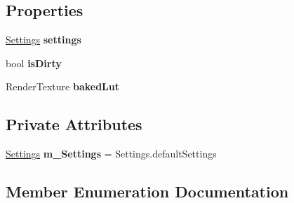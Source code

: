 \subsection*{Properties}
\begin{DoxyCompactItemize}
\item 
\mbox{\label{class_unity_engine_1_1_post_processing_1_1_color_grading_model_a340b78e970e8cc5c66abbd4957d88b9c}} 
\hyperlink{struct_unity_engine_1_1_post_processing_1_1_color_grading_model_1_1_settings}{Settings} {\bfseries settings}
\item 
\mbox{\label{class_unity_engine_1_1_post_processing_1_1_color_grading_model_a05a2c8285ca219e5846080bec932b988}} 
bool {\bfseries is\+Dirty}
\item 
\mbox{\label{class_unity_engine_1_1_post_processing_1_1_color_grading_model_ab93b4bd2bb81196e8751efa337f451f3}} 
Render\+Texture {\bfseries baked\+Lut}
\end{DoxyCompactItemize}
\subsection*{Private Attributes}
\begin{DoxyCompactItemize}
\item 
\mbox{\label{class_unity_engine_1_1_post_processing_1_1_color_grading_model_a3289777e6df942593c34739ba8fbcb4c}} 
\hyperlink{struct_unity_engine_1_1_post_processing_1_1_color_grading_model_1_1_settings}{Settings} {\bfseries m\+\_\+\+Settings} = Settings.\+default\+Settings
\end{DoxyCompactItemize}


\subsection{Member Enumeration Documentation}
\mbox{\label{class_unity_engine_1_1_post_processing_1_1_color_grading_model_a4955bb9dfed7e27c93e7493ff66f3de6}} 
